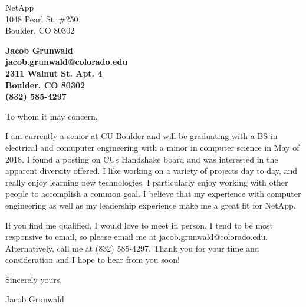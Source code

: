 \documentclass[11pt]{letter} %
\begin{document}

\begin{letter}{
NetApp \\
1048 Pearl St. \#250 \\
Boulder, CO 80302}


\begin{center}
\large\bf Jacob Grunwald \\ jacob.grunwald@colorado.edu \\
2311 Walnut St. Apt. 4 \\ Boulder, CO 80302 \\ (832) 585-4297 %
\end{center}
\vfill



\opening{To whom it may concern,}

I am currently a senior at CU Boulder and will be graduating with a BS in electrical and comuputer engineering with a minor in computer science in May of 2018. I found a posting on CUs Handshake board and was interested in the apparent diversity offered. I like working on a variety of projects day to day, and really enjoy learning new technologies. I particularly enjoy working with other people to accomplish a common goal. I believe that my experience with computer engineering as well as my leadership experience make me a great fit for NetApp.

If you find me qualified, I would love to meet in person. I tend to be most responsive to email, so please email me at jacob.grunwald@colorado.edu. Alternatively, call me at (832) 585-4297. Thank you for your time and consideration and I hope to hear from you soon!

Sincerely yours,

Jacob Grunwald


\end{letter}
\end{document}
